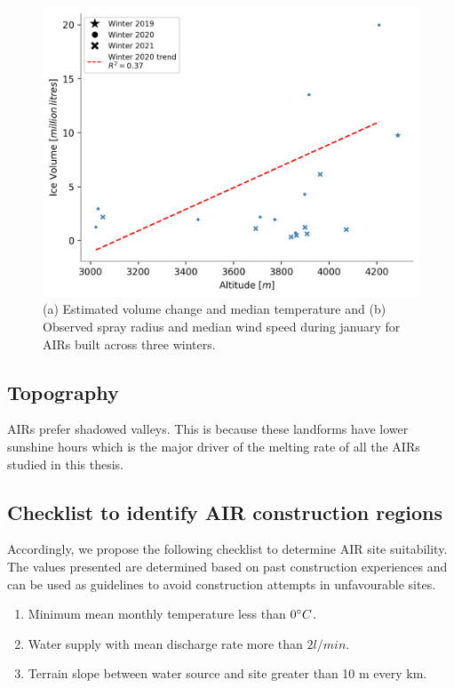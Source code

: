 \begin{figure}[t]
\centering
\includegraphics[width=12cm]{Figures/altitudevsvolume.png}
\caption{(a) Estimated volume change and median temperature and (b) Observed spray radius and median wind speed
during january for AIRs built across three winters. }
\label{fig:altitudevsvolume}
\end{figure}



\subsection{Topography}

AIRs prefer shadowed valleys. This is because these landforms have lower sunshine hours which is the major
driver of the melting rate of all the AIRs studied in this thesis.

\subsection{Checklist to identify AIR construction regions}

Accordingly, we propose the following checklist to determine AIR site suitability. The values presented are
determined based on past construction experiences and can be used as guidelines to avoid construction attempts
in unfavourable sites.

\begin{enumerate}

  \item Minimum mean monthly temperature less than $0 ^{\circ} C$. 
  \item Water supply with mean discharge rate more than $2 l/min$. 
  \item Terrain slope between water source and site greater than 10 m every km. 

\end{enumerate}

